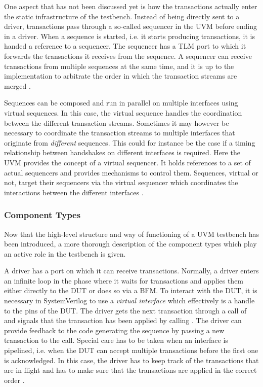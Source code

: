 One aspect that has not been discussed yet is how the transactions actually enter the static infrastructure of the
testbench. Instead of being directly sent to a driver, transactions pass through a so-called sequencer in the UVM
before ending in a driver. When a sequence is started, i.e. it starts producing transactions, it is handed a
reference to a sequencer. The sequencer has a TLM port to which it forwards the transactions it receives from the
sequence. A sequencer can receive transactions from multiple sequences at the same time, and it is up to the
implementation to arbitrate the order in which the transaction streams are merged \cite[Ch. 23]{salemi2013uvm}.

Sequences can be composed and run in parallel on multiple interfaces using virtual sequences. In this case, the
virtual sequence handles the coordination between the different transaction streams. Sometimes it may however be
necessary to coordinate the transaction streams to multiple interfaces that originate from \textit{different}
sequences. This could for instance be the case if a timing relationship between handshakes on different interfaces
is required. Here the UVM provides the concept of a virtual sequencer. It holds references to a set of actual
sequencers and provides mechanisms to control them. Sequences, virtual or not, target their sequencers via the
virtual sequencer which coordinates the interactions between the different interfaces \cite{virtualseq}.

\subsubsection{Component Types} %

Now that the high-level structure and way of functioning of a UVM testbench has been introduced, a more thorough
description of the component types which play an active role in the testbench is given.

A driver has a port on which it can receive transactions. Normally, a driver enters an infinite loop in the 
phase where it waits for transactions and applies them either directly to the DUT or does so via a BFM. To
interact with the DUT, it is necessary in SystemVerilog to use a \textit{virtual interface} which effectively is a
handle to the pins of the DUT. The driver gets the next transaction through a call of  and
signals that the transaction has been applied by calling . The driver can provide feedback to the
code generating the sequence by passing a new transaction to the  call. Special care has to be taken
when an interface is pipelined, i.e. when the DUT can accept multiple transactions before the first one is
acknowledged. In this case, the driver has to keep track of the transactions that are in flight and has to make sure
that the transactions are applied in the correct order \cite[ch. 4.7]{mehta2018asic}.

